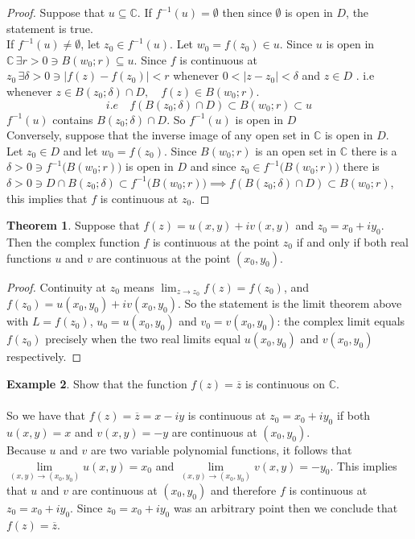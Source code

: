 \documentclass[11pt,a4paper]{article}
\theoremstyle{definition}
\newtheorem{thm}{Theorem}[section]
\newtheorem{example}[thm]{Example}
\begin{document}
\begin{proof}
Suppose that $u\subseteq \mathbb{C}$. If $f^{-1}(u) = \emptyset$  then since $\emptyset$ is open in $D$, the statement is true.\\
If $f^{-1}(u) \neq \emptyset$, let $z_0 \in f^{-1}(u)$. Let $w_0 = f(z_0) \in u$. Since $u$ is open in $\mathbb{C}\,\exists r > 0 \ni B(w_0;r)\subseteq u$.  Since $f$ is continuous at $z_0\, \exists \delta > 0 \ni \left|f(z) - f(z_0)\right| < r$ whenever $0 < \left|z - z_0\right|< \delta$ and $z \in D$ . i.e whenever $z \in  B(z_0;\delta) \cap D, \quad  f(z) \in B(w_0; r)$.\\
$$i.e \quad  f(B(z_0; \delta) \cap D)\subset B(w_0;r)\subset u$$
$f^{-1}(u)$ contains $B(z_0; \delta) \cap D$. So $f^{-1}(u)$ is open in $D$\\

Conversely, suppose that the inverse image of any open set in $\mathbb{C}$ is open in $D$. \\
Let $z_0 \in D$ and let $w_0 = f(z_0)$. Since $B(w_0;r)$ is an open set in $\mathbb{C}$ there is a $\delta > 0 \ni f^{-1}\big(B(w_0;r)\big)$ is open in $D$ and since $z_0 \in f^{-1}\big(B(w_0; r)\big)$ there is\\ $\delta > 0 \ni  D\cap B(z_0;\delta) \subset f^{-1}\big(B(w_0;r)\big)\implies f(B(z_0; \delta) \cap D) \subset B(w_0; r)$, this implies that $f$ is continuous at $z_0$.
\end{proof}

\begin{thm}
Suppose that $f(z) = u(x,y) + iv (x,y)$ and $z_0 = x_0 + i y_0$. Then the complex function $f$ is continuous at the point $z_0$ if and only if  both real functions $u$ and $v$ are continuous at the point $(x_0, y_0)$.
\end{thm}

\begin{proof}
Continuity at $z_0$ means $\lim_{z\rightarrow z_0}f(z)=f(z_0)$, and
$f(z_0)=u(x_0,y_0)+iv(x_0,y_0)$. So the statement is the limit theorem above
with $L=f(z_0)$, $u_0=u(x_0,y_0)$ and $v_0=v(x_0,y_0)$: the complex limit
equals $f(z_0)$ precisely when the two real limits equal $u(x_0,y_0)$ and
$v(x_0,y_0)$ respectively.
\end{proof}

\begin{example}
Show that the function $f(z) = \overline{z}$ is continuous on $\mathbb{C}$.\\

\text{\textcolor{red}{Solution}}\\
So we have that $f(z) = \overline{z} = x  -iy$ is continuous at $z_0 = x_0 + iy_0$ if both $u(x,y)  = x$ and $v(x,y) = - y$ are continuous at $(x_0, y_0)$.\\
Because $u$ and $v$ are two variable polynomial functions, it follows that $\lim\limits_{(x,y)\rightarrow (x_0, y_0)}u(x,y) = x_0$ and $\lim\limits_{(x,y)\rightarrow (x_0, y_0)}v(x,y) = -y_0$. This implies that $u$ and $v$ are continuous at $(x_0, y_0)$ and therefore $f$ is continuous at $z_0 = x_0 + iy_0$. Since $z_0= x_0 + iy_0$ was an arbitrary point then we conclude that $f(z) = \overline{z}$.
\end{example}
\end{document}
